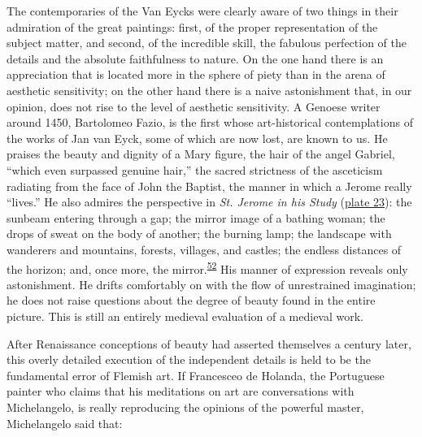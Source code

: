 The contemporaries of the Van Eycks were clearly aware of two things in
their admiration of the great paintings: first, of the proper
representation of the subject matter, and second, of the incredible
skill, the fabulous perfection of the details and the absolute
faithfulness to nature. On the one hand there is an appreciation that is
located more in the sphere of piety than in the arena of aesthetic
sensitivity; on the other hand there is a naive astonishment that, in
our opinion, does not rise to the level of aesthetic sensitivity. A
Genoese writer around 1450, Bartolomeo Fazio, is the first whose
art-historical contemplations of the works of Jan van Eyck, some of
which are now lost, are known to us. He praises the beauty and dignity
of a Mary figure, the hair of the angel Gabriel, ``which even surpassed
genuine hair,'' the sacred strictness of the asceticism radiating from
the face of John the Baptist, the manner in which a Jerome really
``lives.'' He also admires the perspective in \emph{St. Jerome in his
Study}
(\protect\hyperlink{20_ILLUSTRATIONS_FOLLOW_PAGE.xhtmlux5cux23id_22}{plate
23}): the sunbeam entering through a gap; the
\protect\hypertarget{20_ILLUSTRATIONS_FOLLOW_PAGE.xhtmlux5cux23page_320}{}{}mirror
image of a bathing woman; the drops of sweat on the body of another; the
burning lamp; the landscape with wanderers and mountains, forests,
villages, and castles; the endless distances of the horizon; and, once
more, the
mirror.\textsuperscript{\protect\hypertarget{20_ILLUSTRATIONS_FOLLOW_PAGE.xhtmlux5cux23id_369}{\protect\hyperlink{23_NOTES.xhtmlux5cux23id_370}{52}}}
His manner of expression reveals only astonishment. He drifts
comfortably on with the flow of unrestrained imagination; he does not
raise questions about the degree of beauty found in the entire picture.
This is still an entirely medieval evaluation of a medieval work.

After Renaissance conceptions of beauty had asserted themselves a
century later, this overly detailed execution of the independent details
is held to be the fundamental error of Flemish art. If Francesceo de
Holanda, the Portuguese painter who claims that his meditations on art
are conversations with Michelangelo, is really reproducing the opinions
of the powerful master, Michelangelo said that:

